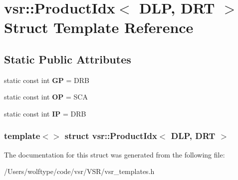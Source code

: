 \hypertarget{structvsr_1_1_product_idx_3_01_d_l_p_00_01_d_r_t_01_4}{\section{vsr\-:\-:Product\-Idx$<$ D\-L\-P, D\-R\-T $>$ Struct Template Reference}
\label{structvsr_1_1_product_idx_3_01_d_l_p_00_01_d_r_t_01_4}
}
\subsection*{Static Public Attributes}
\begin{DoxyCompactItemize}
\item 
\hypertarget{structvsr_1_1_product_idx_3_01_d_l_p_00_01_d_r_t_01_4_a784f3a5fc1e62c93a4bd0836802b51a3}{static const int {\bfseries G\-P} = D\-R\-B}\label{structvsr_1_1_product_idx_3_01_d_l_p_00_01_d_r_t_01_4_a784f3a5fc1e62c93a4bd0836802b51a3}

\item 
\hypertarget{structvsr_1_1_product_idx_3_01_d_l_p_00_01_d_r_t_01_4_afc044da91d3c32335210755de7af0de5}{static const int {\bfseries O\-P} = S\-C\-A}\label{structvsr_1_1_product_idx_3_01_d_l_p_00_01_d_r_t_01_4_afc044da91d3c32335210755de7af0de5}

\item 
\hypertarget{structvsr_1_1_product_idx_3_01_d_l_p_00_01_d_r_t_01_4_aacdf9d7ddd077f29c089d1301ca51dd5}{static const int {\bfseries I\-P} = D\-R\-B}\label{structvsr_1_1_product_idx_3_01_d_l_p_00_01_d_r_t_01_4_aacdf9d7ddd077f29c089d1301ca51dd5}

\end{DoxyCompactItemize}
\subsubsection*{template$<$$>$ struct vsr\-::\-Product\-Idx$<$ D\-L\-P, D\-R\-T $>$}



The documentation for this struct was generated from the following file\-:\begin{DoxyCompactItemize}
\item 
/\-Users/wolftype/code/vsr/\-V\-S\-R/vsr\-\_\-templates.\-h\end{DoxyCompactItemize}
